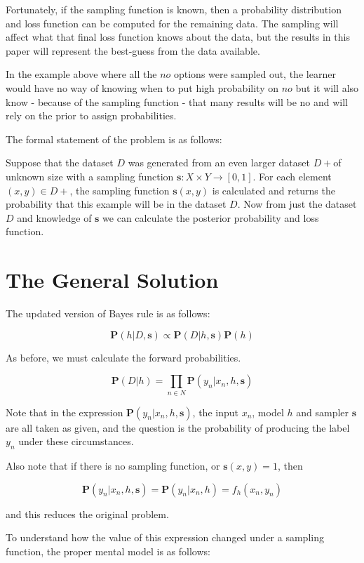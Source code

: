 \documentclass[twoside]{article}
\begin{document}
Fortunately, if the sampling function is known, then a probability distribution and loss function can be computed for the remaining data. The sampling will affect what that final loss function knows about the data, but the results in this paper will represent the best-guess from the data available.

In the example above where all the \(no\) options were sampled out, the learner would have no way of knowing when to put high probability on \(no\) but it will also know - because of the sampling function - that many results will be no and will rely on the prior to assign probabilities.

The formal statement of the problem is as follows:

Suppose that the dataset \(D\) was generated from an even larger dataset \(D+\)of unknown size with a sampling function \(\mathbf{s}: X \times Y \rightarrow \left [ 0,1\right ]\). For each element \((x,y)\in D+\), the sampling function \(\mathbf{s}(x,y)\) is calculated and returns the probability that this example will be in the dataset  \(D\). Now from just the dataset \(D\) and knowledge of \(\mathbf{s}\) we can calculate the posterior probability and loss function.

\section{The General Solution}

The updated version of Bayes rule is as follows:

\[\mathbf{P}(h|D,\mathbf{s})\propto\mathbf{P}(D|h,\mathbf{s})\mathbf{P}(h)\]

As before, we must calculate the forward probabilities.

\[\mathbf{P}(D|h)=\prod_{n \in N} \mathbf{P}(y_n|x_n,h,\mathbf{s})\]

Note that in the expression \(\mathbf{P}(y_n|x_n,h,\mathbf{s})\), the input \(x_n\), model \(h\) and sampler \(\mathbf{s}\) are all taken as given, and the question is the probability of producing the label \(y_n\) under these circumstances.

Also note that if there is no sampling function, or \(\mathbf{s}(x,y)=1\), then 

\[\mathbf{P}(y_n|x_n,h,\mathbf{s}) = \mathbf{P}(y_n|x_n,h)=f_h(x_n,y_n)\]

and this reduces the original problem.

To understand how the value of this expression changed under a sampling function, the proper mental model is as follows:
\end{document}
